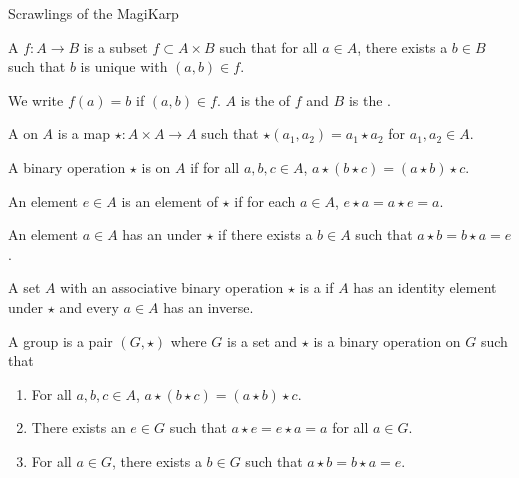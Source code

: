 \documentclass[11pt,letterpaper]{jacky}
\begin{document}
\begin{center}
    \vspace*{20pt}
    \LARGE{Scrawlings of the MagiKarp}
\end{center}

\begin{defi}
    A  $f:A \rightarrow B$ is a subset $f\subset A\times B$ such that for all $a\in A$, there exists a $b\in B$ such that $b$ is unique with $(a,b)\in f$.
\end{defi}

\begin{defi}
    We write $f(a)=b$ if $(a,b)\in f$. $A$ is the  of $f$ and $B$ is the .
\end{defi}

\begin{defi}
    A  on $A$ is a map $\star:A\times A\rightarrow A$ such that $\star(a_1,a_2)=a_1\star a_2$ for $a_1,a_2\in A$.
\end{defi}

\begin{defi}
    A binary operation $\star$ is  on $A$ if for all $a,b,c\in A$, $a\star(b\star c)=(a\star b)\star c$.
\end{defi}

\begin{defi}
    An element $e\in A$ is an  element of $\star$ if for each $a\in A$, $e\star a=a\star e=a$.
\end{defi}

\begin{defi}
    An element $a\in A$ has an  under $\star$ if there exists a $b\in A$ such that $a\star b=b\star a=e$.
\end{defi}

\begin{defi}
    A set $A$ with an associative binary operation $\star$ is a  if $A$ has an identity element under $\star$ and every $a\in A$ has an inverse.
\end{defi}

\begin{bdefi}
    A group is a pair $(G,\star)$ where $G$ is a set and $\star$ is a binary operation on $G$ such that
    \begin{enumerate}
        \item For all $a,b,c\in A$, $a\star(b\star c)=(a\star b)\star c$.
        \item There exists an $e\in G$ such that $a\star e=e\star a=a$ for all $a\in G$.
        \item For all $a\in G$, there exists a $b\in G$ such that $a\star b=b\star a=e$.
    \end{enumerate}
\end{bdefi}
\end{document}
